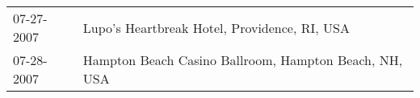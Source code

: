 \begin{supertabular}{ll}
 07-27-2007 &           Lupo's Heartbreak Hotel, Providence, RI, USA \\
 07-28-2007 &  Hampton Beach Casino Ballroom, Hampton Beach, NH, USA \\
\end{supertabular}
